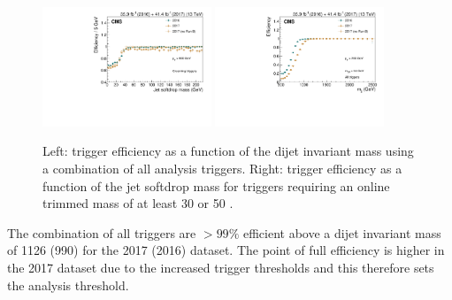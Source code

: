 \begin{figure}[h!]
\centering 
\includegraphics[width=0.45\textwidth]{figures/analysis/search3/B2G-18-002/Combined_mj1_16vs17.pdf}
\includegraphics[width=0.45\textwidth]{figures/analysis/search3/B2G-18-002/Combined_mjj_16vs17.pdf}
\caption{Left: trigger efficiency as a function of the dijet invariant mass using a combination of all analysis triggers. Right: trigger efficiency as a function of the jet softdrop mass for triggers requiring an online trimmed mass of at least 30 or 50 \GeV.}
\label{fig:searchIII:trigturnon}
\end{figure}
The combination of all triggers are $>99\%$ efficient above a dijet invariant mass of 1126 (990) \GeV for the 2017 (2016) dataset. The point of full efficiency is higher in the 2017 dataset due to the increased trigger thresholds and this therefore sets the analysis threshold. 

